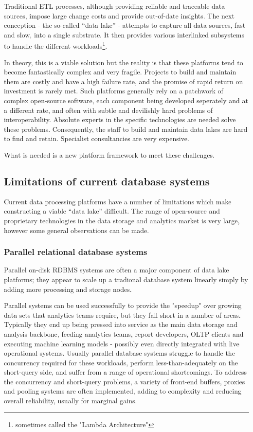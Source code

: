 \documentclass[12pt]{article}
\begin{document}
Traditional ETL processes, although providing reliable and traceable data sources, impose large change costs and provide
out-of-date insights. The next conception - the so-called “data lake” - attempts to capture all data sources, fast and slow, 
into a single substrate. It then provides various interlinked subsystems to handle the different workloads\footnote{sometimes called the "Lambda Architecture"}. 

In theory, this is a viable solution but the reality is that these platforms tend to become fantastically complex and very fragile. Projects
to build and maintain them are costly and have a high failure rate, and the promise of rapid return on investment is rarely met. 
Such platforms generally rely on a patchwork of complex open-source software, each component being developed seperately and at a different rate, 
and often with subtle and devilishly hard problems of interoperability. Absolute experts in the specific technologies are needed solve these problems. 
Consequently, the staff to build and maintain data lakes are hard to find and retain. Specialist 
consultancies are very expensive. 

What is needed is a new platform framework to meet these challenges.

\subsection{Limitations of current database systems}

Current data processing platforms have a number of limitations which make constructing a viable “data lake” difficult. The range of 
open-source and proprietary technologies in the data storage and analytics market is very large, however some general observations can be made.

\subsubsection{Parallel relational database systems}

Parallel on-disk RDBMS systems are often a major component of data lake platforms; they appear to scale up a tradional database system linearly simply
by adding more processing and storage nodes. 

Parallel systems can be used successfully to provide the "speedup" over growing data sets 
that analytics teams require, but they fall short in a number of areas. Typically they end up being pressed into service as the main data storage 
and analysis backbone, feeding analytics teams, report developers, OLTP clients and executing machine learning models - possibly even directly 
integrated with live operational systems. Usually parallel database systems struggle to handle the concurrency required for these 
workloads, perform less-than-adequately on the short-query side, and suffer from a range of operational shortcomings. To address the 
concurrency and short-query problems, a variety of front-end buffers, proxies and pooling systems are often implemented, adding to complexity 
and reducing overall reliability, usually for marginal gains. 
\end{document}
